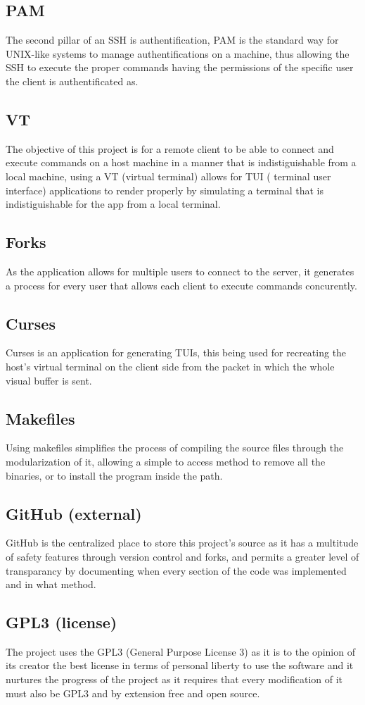 \documentclass{article}
\begin{document}
    \subsection{PAM}
    The second pillar of an SSH is authentification, PAM is the standard way for UNIX-like systems to manage authentifications on a machine, thus allowing the SSH to execute the proper commands having the permissions of the specific user the client is authentificated as.
    \subsection{VT}
    The objective of this project is for a remote client to be able to connect and execute commands on a host machine in a manner that is indistiguishable from a local machine, using a VT (virtual terminal) allows for TUI ( terminal user interface) applications to render properly by simulating a terminal that is indistiguishable for the app from a local terminal.
    \subsection{Forks}
    As the application allows for multiple users to connect to the server, it generates a process for every user that allows each client to execute commands concurently.
    \subsection{Curses}
    Curses is an application for generating TUIs, this being used for recreating the host's virtual terminal on the client side from the packet in which the whole visual buffer is sent.
    \subsection{Makefiles}
    Using makefiles simplifies the process of compiling the source files through the modularization of it, allowing a simple to access method to remove all the binaries, or to install the program inside the path.
    \subsection{GitHub (external)}
    GitHub is the centralized place to store this project's source as it has a multitude of safety features through version control and forks, and permits a greater level of transparancy by documenting when every section of the code was implemented and in what method.
    \subsection{GPL3 (license)}
    The project uses the GPL3 (General Purpose License 3) as it is to the opinion of its creator the best license in terms of personal liberty to use the software and it nurtures the progress of the project as it requires that every modification of it must also be GPL3 and by extension free and open source.
\end{document}
